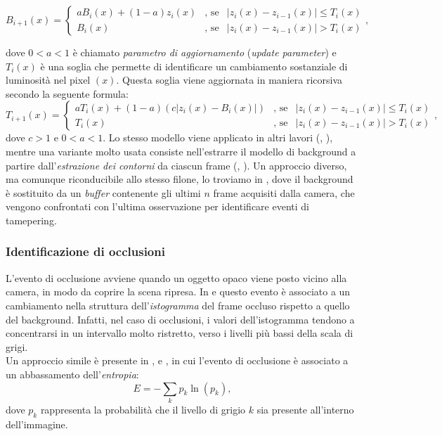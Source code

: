 \[
\label{eq:background}
B_{i + 1}(x)=\left\{ \begin{array} {lcl}
aB_i(x)+ (1-a)z_i(x) & \mbox{, se} & |z_i(x) - z_{i-1}(x)|\leq T_i(x) \\
B_i(x) & \mbox{, se} & |z_i(x) - z_{i-1}(x)|>T_i(x)\end{array} \right. ,
\]

dove $0 < a < 1$ \`e chiamato \textit{parametro di aggiornamento} (\textit{update parameter}) e $T_i(x)$ \`e una soglia che permette di identificare un cambiamento sostanziale di luminosit\`a nel pixel $(x)$. 
 Questa soglia viene aggiornata in maniera ricorsiva secondo la seguente formula:
  \[
  \label{eq:backgroundThreshUpd}
  T_{i + 1}(x)=\left\{ \begin{array} {lcl}
  aT_i(x)+ (1-a)(c |z_i(x) - B_i(x)|) & \mbox{, se} & |z_i(x) - z_{i-1}(x)|\leq T_i(x) \\
  T_i(x) & \mbox{, se} & |z_i(x) - z_{i-1}(x)|>T_i(x) \end{array} \right. ,
  \]
  dove $c > 1$ e $0<a<1$.
  Lo stesso modello viene applicato in altri lavori (\cite{saglam2009real}, \cite{tsesmelis2013tamper}), mentre una variante molto usata consiste nell'estrarre il modello di background a partire dall'\textit{estrazione dei contorni} da ciascun frame (\cite{harasse2004automated}, \cite{gil2007automatic}).
  Un approccio diverso, ma comunque riconducibile allo stesso filone, lo troviamo in \cite{ribnick2006real}, dove il background \`e sostituito da un \textit{buffer} contenente gli ultimi $n$ frame acquisiti dalla camera, che vengono confrontati con l'ultima osservazione per identificare eventi di tamepering.
\subsubsection{Identificazione di occlusioni}
L'evento di occlusione avviene quando un oggetto opaco viene posto vicino alla camera, in modo da coprire la scena ripresa.
In \cite{aksay2007camera} e \cite{saglam2009real} questo evento \`e associato a un cambiamento nella struttura dell'\textit{istogramma} del frame occluso rispetto a quello del background.
Infatti, nel caso di occlusioni, i valori dell'istogramma tendono a concentrarsi in un intervallo molto ristretto, verso i livelli pi\`u bassi della scala di grigi.\\
Un approccio simile \`e presente in \cite{harasse2004automated}, \cite{gil2007automatic} e \cite{ellwart2012camera}, in cui l'evento di occlusione \`e associato a un abbassamento dell'\textit{entropia}:
 \[
 \label{eq:entropy}
 E=-\sum_{k}p_k\ln(p_k) ,
 \]
 dove $p_k$ rappresenta la probabilit\`a che il livello di grigio $k$ sia presente all'interno dell'immagine. 
